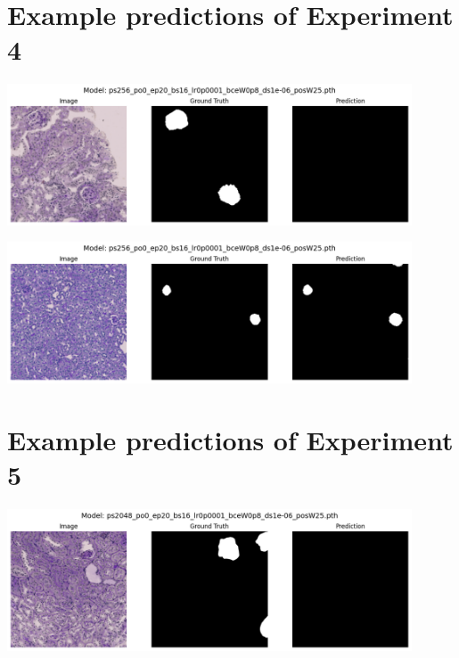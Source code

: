\documentclass[12pt]{article}
\begin{document}

\printbibliography

% 

\newpage

\appendix

\section{Example predictions of Experiment 4}

\includegraphics[width=0.9\textwidth]{Images/smol_bad.png}
\vspace{1cm}

\includegraphics[width=0.9\textwidth]{Images/smol_good.png}

\newpage

\section{Example predictions of Experiment 5}

\includegraphics[width=0.9\textwidth]{Images/big_bad.png}
\vspace{1cm}
\end{document}
